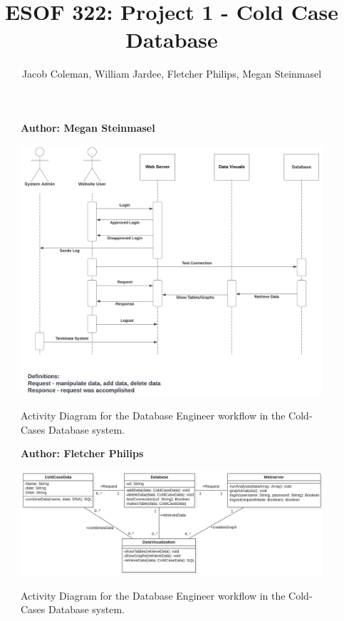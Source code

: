 \documentclass[11pt]{article}
\begin{document}
\title{ESOF 322: Project 1 - Cold Case Database}
\author{Jacob Coleman, William Jardee, Fletcher Philips, Megan Steinmasel}
\maketitle


\begin{figure}[!ht]
\centering
\textbf{Author: Megan Steinmasel}
\vspace{1em}

	\includegraphics[width=.85\textwidth]{./project2-Diagrams/ccsequence.png}\\
	\caption{Activity Diagram for the Database Engineer workflow in the Cold-Cases Database system.}
	\label{fig:ccSequence}
\end{figure}

\begin{figure}[!ht]
\centering
\textbf{Author: Fletcher Philips}
\vspace{1em}

	\includegraphics[width=.95\textwidth]{./project2-Diagrams/project2ClassDiagram.png}\\
	\caption{Activity Diagram for the Database Engineer workflow in the Cold-Cases Database system.}
	\label{fig:classDiagram}
\end{figure}
\end{document}
